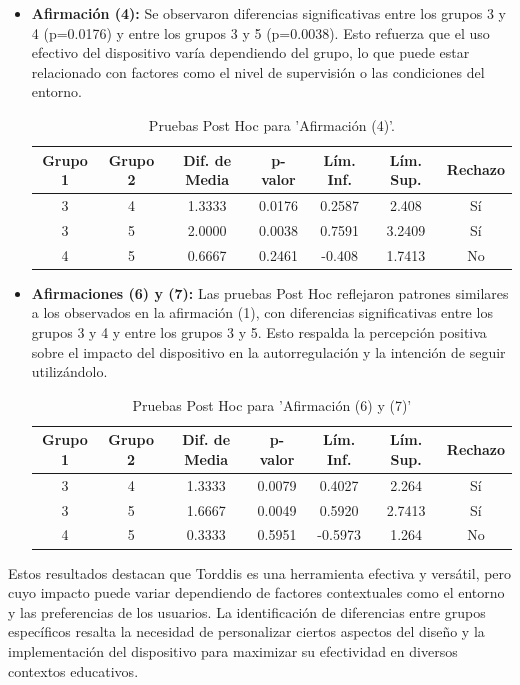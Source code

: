 \begin{itemize}
\item \textbf{Afirmación (4):} Se observaron diferencias significativas entre los grupos 3 y 4 (p=0.0176) y entre los grupos 3 y 5 (p=0.0038). Esto refuerza que el uso efectivo del dispositivo varía dependiendo del grupo, lo que puede estar relacionado con factores como el nivel de supervisión o las condiciones del entorno.
\begin{table}[ht]
	\centering
	\caption{Pruebas Post Hoc para 'Afirmación (4)'.}
	\begin{tabularx}{0.75\textwidth}{ccccccc}
		\hline
		\textbf{Grupo 1} & \textbf{Grupo 2} & \textbf{Dif. de Media} & \textbf{p-valor} & \textbf{Lím. Inf.} & \textbf{Lím. Sup.} & \textbf{Rechazo} \\
		\hline
		3 & 4 & 1.3333 & 0.0176 & 0.2587 & 2.408 & Sí \\
		3 & 5 & 2.0000 & 0.0038 & 0.7591 & 3.2409 & Sí \\
		4 & 5 & 0.6667 & 0.2461 & -0.408 & 1.7413 & No \\
		\hline
	\end{tabularx}
	\label{table:posthoc_4}
\end{table}
\item \textbf{Afirmaciones (6) y (7):} Las pruebas Post Hoc reflejaron patrones similares a los observados en la afirmación (1), con diferencias significativas entre los grupos 3 y 4 y entre los grupos 3 y 5. Esto respalda la percepción positiva sobre el impacto del dispositivo en la autorregulación y la intención de seguir utilizándolo.
\begin{table}[ht]
	\centering
	\caption{Pruebas Post Hoc para 'Afirmación (6) y (7)'}
	\begin{tabularx}{0.75\textwidth}{ccccccc}
		\hline
		\textbf{Grupo 1} & \textbf{Grupo 2} & \textbf{Dif. de Media} & \textbf{p-valor} & \textbf{Lím. Inf.} & \textbf{Lím. Sup.} & \textbf{Rechazo} \\
		\hline
		3 & 4 & 1.3333 & 0.0079 & 0.4027 & 2.264 & Sí \\
		3 & 5 & 1.6667 & 0.0049 & 0.5920 & 2.7413 & Sí \\
		4 & 5 & 0.3333 & 0.5951 & -0.5973 & 1.264 & No \\
		\hline
	\end{tabularx}
	\label{table:posthoc_6y7}
\end{table}
\end{itemize}

Estos resultados destacan que Torddis es una herramienta efectiva y versátil, pero cuyo impacto puede variar dependiendo de factores contextuales como el entorno y las preferencias de los usuarios. La identificación de diferencias entre grupos específicos resalta la necesidad de personalizar ciertos aspectos del diseño y la implementación del dispositivo para maximizar su efectividad en diversos contextos educativos.

